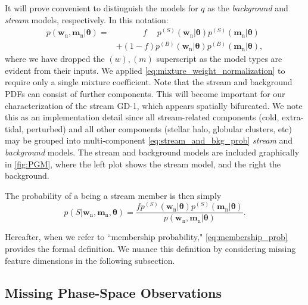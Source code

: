 \documentclass[twocolumn, linenumbers]{aastex631}
\newcommand{\stream}[1]{#1}
\newcommand{\mrm}[1]{\mathrm{#1}}
\newcommand{\mbs}[1]{\boldsymbol{#1}}
\newcommand{\pdf}{p}
\newcommand{\nth}[1]{{#1}_{\mrm{n}}}  %
\newcommand{\smallcomponent}[2]{#2^{\scriptscriptstyle (#1)}}
\newcommand{\cmp}[2]{\smallcomponent{#1}{#2}}
\newcommand{\Scmp}[1]{\cmp{S}{#1}}
\newcommand{\Bcmp}[1]{\cmp{B}{#1}}
\newcommand{\Spdf}{\Scmp{\pdf}}
\newcommand{\Bpdf}{\Bcmp{\pdf}}
\begin{document}
        It will prove convenient to distinguish the models for $q$ as the
        \textit{background} and \textit{stream} models, respectively. In this
        notation:
        \begin{align} \label{eq:stream_and_bkg_prob}
            \pdf(\nth{\mbs{w}}, \nth{\mbs{m}} | \mbs{\theta})
            =& \phantom{+} \qquad f \phantom{+} \Spdf(\nth{\mbs{w}}|\mbs{\theta}) \Spdf(\nth{\mbs{m}}|\mbs{\theta}) \\
            & + (1-f) \Bpdf(\nth{\mbs{w}}|\mbs{\theta}) \Bpdf(\nth{\mbs{m}}|\mbs{\theta}), \nonumber
        \end{align}
        where we have dropped the $(w), (m)$ superscript as the model types are
        evident from their inputs. We applied
        \autoref{eq:mixture_weight_normalization} to require only a single
        mixture coefficient.  Note that the stream and background PDFs can
        consist of further components. This will become important for our
        characterization of the stream \stream{GD-1}, which appears spatially
        bifurcated. We note this as an implementation detail since all
        stream-related components (cold, extra-tidal, perturbed) and all other
        components (stellar halo, globular clusters, etc) may be grouped into
        multi-component \autoref{eq:stream_and_bkg_prob} \textit{stream} and
        \textit{background} models.  The stream and background models are
        included graphically in \autoref{fig:PGM}, where the left plot shows the
        stream model, and the right the background.

        The probability of a being a stream member is then simply
        \begin{equation}\label{eq:membership_prob}
            \pdf\!\left(S | \nth{\mbs{w}}, \nth{\mbs{m}}, \mbs{\theta} \right)
            = \frac{f \Spdf(\nth{\mbs{w}}|\mbs{\theta}) \Spdf(\nth{\mbs{m}}|\mbs{\theta}) }{ \pdf(\nth{\mbs{w}}, \nth{\mbs{m}} | \mbs{\theta})}.
        \end{equation}

        Hereafter, when we refer to ``membership probability,"
        \autoref{eq:membership_prob} provides the formal definition. We nuance
        this definition by considering missing feature dimensions in the
        following subsection.

    \subsection{Missing Phase-Space Observations}
    \label{sub:method:missing_data}
\end{document}
